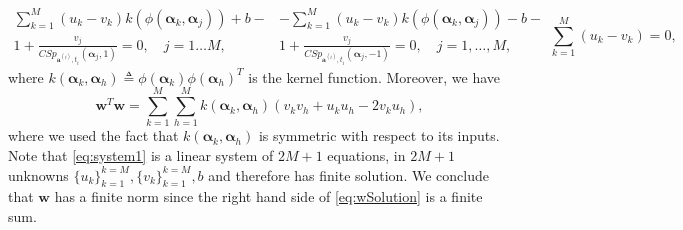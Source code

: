 \documentclass[draftcls,journal,onecolumn]{IEEEtran}
\newcommand{\wrt}{with respect to }
\begin{document}
	\begin{subequations}
		\label{eq:system1}
		\begin{equation}
		\begin{split}
		\sum_{k=1}^{M} (u_k - v_k) k(\phi (\bm{\alpha}_k,\bm{\alpha}_j)) + b - \\ 1 + \frac{v_j}{CSp_{\bm{a}^{(i)},t_i}(\bm{\alpha}_j,1)} = 0,
		\quad j=1\dots M,
		\end{split}
		\end{equation}
		\begin{equation}
		\begin{split}
		- \sum_{k=1}^{M} (u_k - v_k) k(\phi (\bm{\alpha}_k,\bm{\alpha}_j)) - b - \\ 1 + \frac{v_j}{CSp_{\bm{a}^{(i)},t_i}(\bm{\alpha}_j,-1)} = 0,
		\quad j=1,\dots, M,
		\end{split}
		\end{equation}
		\begin{equation}
		\sum_{k=1}^{M} (u_k - v_k) = 0,
		\end{equation}
	\end{subequations}
	where $k(\bm{\alpha}_k,\bm{\alpha}_h) \triangleq \phi(\bm{\alpha}_k) \phi(\bm{\alpha}_h)^T$ is the kernel function.
	 Moreover, we have
	\begin{equation}
	\label{eq:wSolution}
	\bm{w}^T\bm{w} =  \sum_{k=1}^{M} \sum_{h=1}^{M} k(\bm{\alpha}_k,\bm{\alpha}_h) (v_kv_h + u_ku_h -2 v_ku_h),
	\end{equation}
	where we used the fact that $k(\bm{\alpha}_k,\bm{\alpha}_h)$
	 is symmetric \wrt its inputs. Note that \eqref{eq:system1} is a linear system of $2M + 1$ equations, in $2M + 1$ unknowns $\{u_k\}_{k=1}^{k=M},\{v_k\}_{k=1}^{k=M},b$ and therefore has finite solution. 	We conclude that $\bm{w}$ has a finite norm since the right hand side of \eqref{eq:wSolution} is a finite sum.

%
%
\renewcommand*{\bibfont}{\footnotesize}
\end{document}
